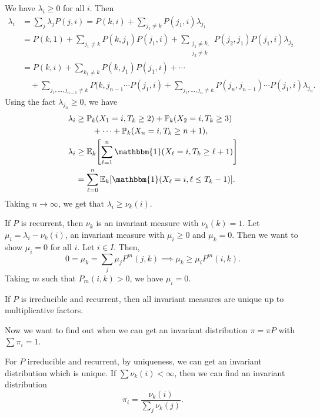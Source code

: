 \documentclass[12pt]{article}
\begin{document}
\begin{proofbox}
	We have $\lambda_i \geq 0$ for all $i$. Then
	\begin{align*}
		\lambda_i &= \sum_{j} \lambda_j P(j, i) = P(k, i) + \sum_{j_1 \neq k} P(j_1, i) \lambda_{j_1} \\
			  &= P(k,1) + \sum_{j_1 \neq k}P(k, j_1)P(j_1, i) + \sum_{\substack{j_1 \neq k, \\j_2 \neq k}} P(j_2, j_1)P(j_1, i) \lambda_{j_2} \\
			  &= P(k,i) + \sum_{k_1 \neq k}P(k, j_1)P(j_1, i) + \cdots \\
			  &\quad + \sum_{j_1, \ldots, j_{n-1} \neq k} P(k, j_{n-1} \cdots P(j_1,i) + \sum_{j_1, \ldots, j_{n} \neq k}P(j_n, j_{n-1}) \cdots P(j_1, i) \lambda_{j_n}.
	\end{align*}
	Using the fact $\lambda_{j_n} \geq 0$, we have
	\begin{align*}
		\lambda_i &\geq \mathbb{P}_k(X_1 = i, T_k \geq 2) + \mathbb{P}_k(X_2 = i, T_k \geq 3) \\
			  & \qquad + \cdots + \mathbb{P}_k(X_n = i, T_k \geq n+1), \\
		\lambda_i &\geq \mathbb{E}_k\Biggl[\sum_{\ell = 1}^{n}\mathbbm{1}(X_{\ell} = i, T_k \geq \ell + 1) \Biggr] \\
			  &= \sum_{\ell = 0}^{n} \mathbb{E}_k[\mathbbm{1}(X_{\ell} = i, \ell \leq T_{k}-1)].
	\end{align*}
	Taking $n \to \infty$, we get that $\lambda_i \geq \nu_k(i)$.

	If $P$ is recurrent, then $\nu_k$ is an invariant measure with $\nu_k(k) = 1$. Let $\mu_i = \lambda_i - \nu_k(i)$, an invariant measure with $\mu_i \geq 0$ and $\mu_k = 0$. Then we want to show $\mu_i = 0$ for all $i$. Let $i \in I$. Then,
	\[
		0 = \mu_k = \sum_{j} \mu_j P^{m}(j, k) \implies \mu_k \geq \mu_i P^{m}(i,k)
	.\]
	Taking $m$ such that $P_m(i, k) > 0$, we have $\mu_i = 0$.
\end{proofbox}

\begin{remark}
	If $P$ is irreducible and recurrent, then all invariant measures are unique up to multiplicative factors.
\end{remark}

Now we want to find out when we can get an invariant distribution $\pi = \pi P$ with $\sum \pi_i = 1$.

For $P$ irreducible and recurrent, by uniqueness, we can get an invariant distribution which is unique. If $\sum \nu_k(i) < \infty$, then we can find an invariant distribution
\[
	\pi_i = \frac{\nu_k(i)}{\sum_{j} \nu_k(j)}
.\]
\end{document}
